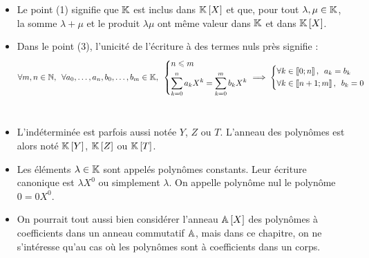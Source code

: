 \begin{rem}
\begin{itemize}
\item Le point (1) signifie que \(\mathbb{K}\) est inclus dans \(\poly\) et que, pour tout \(\lambda,\mu\in\mathbb{K}\), la somme \(\lambda+\mu\) et le produit \(\lambda\mu\) ont même valeur dans \(\mathbb{K}\) et dans \(\poly\). \\

\item Dans le point (3), l'unicité de l'écriture à des termes nuls près signifie : \[\quantifs{\forall m,n\in\N;\forall a_0,\dots,a_n,b_0,\dots,b_m\in\K}\begin{dcases}n\leq m \\ \sum_{k=0}^na_kX^k=\sum_{k=0}^mb_kX^k\end{dcases}\imp\begin{dcases}\quantifs{\forall k\in\interventierii{0}{n}}a_k=b_k \\ \quantifs{\forall k\in\interventierii{n+1}{m}}b_k=0\end{dcases}\] \\

\item L'indéterminée est parfois aussi notée \(Y\), \(Z\) ou \(T\). L'anneau des polynômes est alors noté \(\poly[\K][Y]\), \(\poly[\K][Z]\) ou \(\poly[\K][T]\). \\

\item Les éléments \(\lambda\in\mathbb{K}\) sont appelés polynômes constants. Leur écriture canonique est \(\lambda X^0\) ou simplement \(\lambda\). On appelle polynôme nul le polynôme \(0=0X^0\). \\

\item On pourrait tout aussi bien considérer l'anneau \(\poly[\A]\) des polynômes à coefficients dans un anneau commutatif \(\mathbb{A}\), mais dans ce chapitre, on ne s'intéresse qu'au cas où les polynômes sont à coefficients dans un corps. \\
\end{itemize}
\end{rem}

